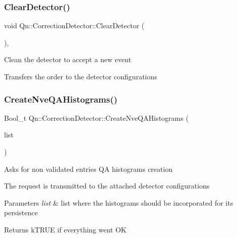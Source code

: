 \subsubsection{\texorpdfstring{Clear\+Detector()}{ClearDetector()}}
{\footnotesize\ttfamily void Qn\+::\+Correction\+Detector\+::\+Clear\+Detector (\begin{DoxyParamCaption}{ }\end{DoxyParamCaption})\hspace{0.3cm}{\ttfamily [inline]}, {\ttfamily [virtual]}}

Clean the detector to accept a new event

Transfers the order to the detector configurations \mbox{\label{classQn_1_1CorrectionDetector_a24c31acbd10eaf982a10b304390de47c}} 
\subsubsection{\texorpdfstring{Create\+Nve\+Q\+A\+Histograms()}{CreateNveQAHistograms()}}
{\footnotesize\ttfamily Bool\+\_\+t Qn\+::\+Correction\+Detector\+::\+Create\+Nve\+Q\+A\+Histograms (\begin{DoxyParamCaption}\item[{T\+List $\ast$}]{list }\end{DoxyParamCaption})}

Asks for non validated entries QA histograms creation

The request is transmitted to the attached detector configurations 
\begin{DoxyParams}{Parameters}
{\em list} & list where the histograms should be incorporated for its persistence \\
\hline
\end{DoxyParams}
\begin{DoxyReturn}{Returns}
k\+T\+R\+UE if everything went OK 
\end{DoxyReturn}
\mbox{\label{classQn_1_1CorrectionDetector_a3670d14b0e6fc446631c87dc5bb0d12b}} 

